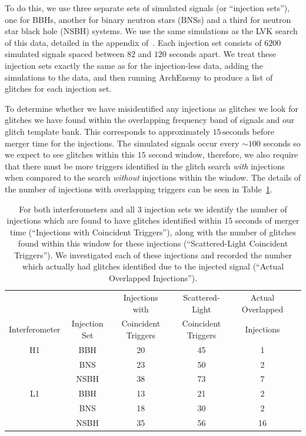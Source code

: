 To do this, we use three separate sets of simulated \gwadj signals (or ``injection sets''), one for BBHs, another for binary neutron stars (BNSs) and a third for neutron star black hole (NSBH) systems. We use the same simulations as the LVK search of this data, detailed in the appendix of~\cite{gwtc3:2023}. Each injection set consists of $6200$ simulated signals spaced between $82$ and $120$ seconds apart. We treat these injection sets exactly the same as for the injection-less data, adding the simulations to the data, and then running ArchEnemy to produce a list of \scladj glitches for each injection set.

To determine whether we have misidentified any \gwadj injections as \scladj glitches we look for glitches we have found within the overlapping frequency band of \gwadj signals and our \scladj glitch template bank. This corresponds to approximately $15 \, \text{seconds}$ before merger time for the injections. The simulated signals occur every ${\sim}100$ seconds so we expect to see glitches within this $15$ second window, therefore, we also require that there must be more triggers identified in the \scladj glitch search \emph{with} injections when compared to the search \emph{without} injections within the window. The details of the number of \gwadj injections with overlapping \scladj triggers can be seen in Table~\ref{4:tab:coincident_triggers}.

\begin{table}[tb]
\caption{\label{4:tab:coincident_triggers}For both interferometers and all $3$ injection sets we identify the number of injections which are found to have \scladj glitches identified within $15$ seconds of merger time (``Injections with Coincident Triggers''), along with the number of \scladj glitches found within this window for these injections (``Scattered-Light Coincident Triggers''). We investigated each of these injections and recorded the number which actually had \scladj glitches identified due to the injected \gwadj signal (``Actual Overlapped Injections'').}
\footnotesize
\renewcommand{\arraystretch}{1.2}
\begin{tabular}{@{}cccccc}
\hline
&    & Injections with& Scattered-Light & Actual Overlapped \\
Interferometer & Injection Set & Coincident Triggers& Coincident Triggers&Injections \\
\hline
H1 & BBH           & 20 & 45 & 1\\
   & BNS           & 23 & 50 & 2\\
   & NSBH          & 38 & 73 & 7\\
L1 & BBH           & 13 & 21 & 2\\
   & BNS           & 18 & 30 & 2\\
   & NSBH          & 35 & 56 & 16\\
\hline
\end{tabular}

\end{table}

